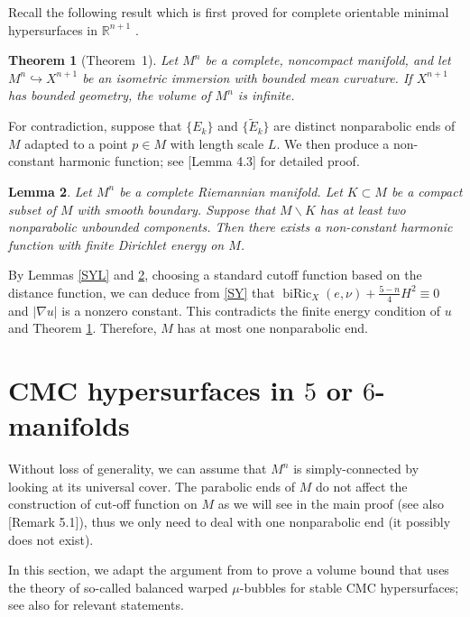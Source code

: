 \documentclass[11pt,letterpaper]{amsart}
\DeclareMathOperator{\biRic}{biRic}
\newcommand{\cE}{\widetilde{E}}
\newcommand{\bR}{\mathbb{R}}
\newtheorem{theorem}{Theorem}[section]
\newtheorem{lemma}[theorem]{Lemma}
\theoremstyle{definition}
\theoremstyle{remark}
\numberwithin{equation}{section}
\begin{document}
Recall the following result which is first proved for complete orientable minimal hypersurfaces in $\bR^{n+1}$ \cite{Cao-Shen-Zhu-infinitevolume}.

\begin{theorem}[\cite{Frensel-CMC}{Theorem~1}]\label{infinitevol}
    Let $M^n$ be a complete, noncompact manifold, and let $M^n\hookrightarrow X^{n+1}$ be an isometric immersion with bounded mean curvature. If $X^{n+1}$ has bounded geometry, the volume of $M^n$ is infinite.
\end{theorem}


For contradiction, suppose that $\{E_k\}$ and $\{\cE_k\}$ are distinct nonparabolic ends of $M$ adapted to a point $p\in M$ with length scale $L$. We then produce a non-constant harmonic function; see \cite{chodosh-li-stryker}[Lemma 4.3] for detailed proof.
\begin{lemma}\label{harmonic}
    Let $M^n$ be a complete Riemannian manifold. Let $K\subset M$ be a compact subset of $M$ with smooth boundary. Suppose that $M\backslash K$ has at least two nonparabolic unbounded components. Then there exists a non-constant harmonic function with finite Dirichlet energy on $M$.
\end{lemma}

By Lemmas \ref{SYL} and \ref{harmonic}, choosing a standard cutoff function based on the distance function, we can deduce from \eqref{SY} that 
$\biRic_X(e,\nu)+\frac{5-n}{4}H^2\equiv 0$ and $|\nabla u|$ is a nonzero constant. This contradicts the finite energy condition of 
$u$ and Theorem \ref{infinitevol}. Therefore, 
$M$ has at most one nonparabolic end.


\section{CMC hypersurfaces in $5$ or $6$-manifolds}
Without loss of generality, we can assume that $M^n$ is simply-connected by looking at its universal cover. The parabolic ends of $M$ do not affect the construction of cut-off function on $M$ as we will see in the main proof (see also \cite{chodosh-li-stryker}[Remark 5.1]), thus we only need to deal with one nonparabolic end (it possibly does not exist). 

In this section, we adapt the argument from \cite{chodosh-li-stryker} to prove a volume bound that uses the theory of so-called balanced warped $\mu$-bubbles for stable CMC hypersurfaces; see also \cite{Gromov19,chodosh-li-bubble} for relevant statements. 
\end{document}

